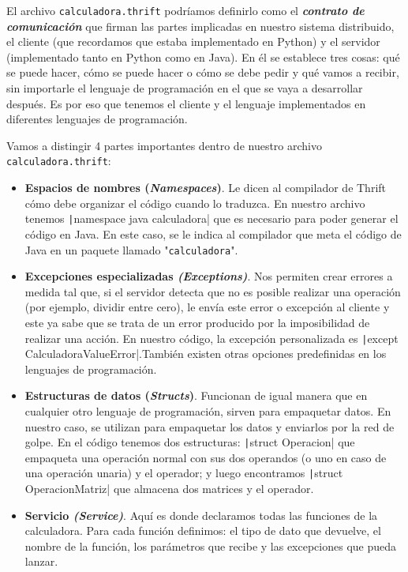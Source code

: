 \documentclass[a4paper,12pt]{article}
\begin{document}
			\inputminted[linenos, frame=lines, fontsize=\footnotesize]{Thrift}{../codigo/calculadora.thrift}
			
			 El archivo \texttt{calculadora.thrift} podríamos definirlo como el \textbf{\textit{contrato de comunicación}} que firman las partes implicadas en nuestro sistema distribuido, el cliente (que recordamos que estaba implementado en Python) y el servidor (implementado tanto en Python como en Java). En él se establece tres cosas: qué se puede hacer, cómo se puede hacer o cómo se debe pedir y qué vamos a recibir, sin importarle el lenguaje de programación en el que se vaya a desarrollar después. Es por eso que tenemos el cliente y el lenguaje implementados en diferentes lenguajes de programación.
			 
			 Vamos a distingir 4 partes importantes dentro de nuestro archivo \newline \texttt{calculadora.thrift}:
			 \begin{itemize}
			 	\item \textbf{Espacios de nombres (\textit{Namespaces})}. Le dicen al compilador de Thrift cómo debe organizar el código cuando lo traduzca. En nuestro archivo tenemos \texttt|namespace java calculadora| que es necesario para poder generar el código en Java. En este caso, se le indica al compilador que meta el código de Java en un paquete llamado "\texttt{calculadora}".
			 	
			 	\item \textbf{Excepciones especializadas \textit{(Exceptions)}}. Nos permiten crear errores a medida tal que, si el servidor detecta que no es posible realizar una operación (por ejemplo, dividir entre cero), le envía este error o excepción al cliente y este ya sabe que se trata de un error producido por la imposibilidad de realizar una acción. En nuestro código, la excepción personalizada es \texttt|except CalculadoraValueError|.También existen otras opciones predefinidas en los lenguajes de programación.
			 	
			 	\item \textbf{Estructuras de datos (\textit{Structs})}.  Funcionan de igual manera que en cualquier otro lenguaje de programación, sirven para empaquetar datos. En nuestro caso, se utilizan para empaquetar los datos y enviarlos por la red de golpe. En el código tenemos dos estructuras: \texttt|struct Operacion| que empaqueta una operación normal con sus dos operandos (o uno en caso de una operación unaria) y el operador; y luego encontramos \texttt|struct OperacionMatriz| que almacena dos matrices y el operador.
			 	
			 	\item \textbf{Servicio \textit{(Service)}}. Aquí es donde declaramos todas las funciones de la calculadora. Para cada función definimos: el tipo de dato que devuelve, el nombre de la función, los parámetros que recibe y las excepciones que pueda lanzar. 
			 \end{itemize}
		
\end{document}

